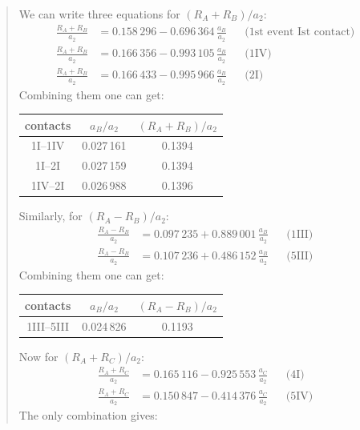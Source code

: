 \begin{description}
\begin{description}
\begin{quote}
    We can write three equations for $(R_A + R_B)/a_2$:
    \begin{align*}
      \frac{R_A + R_B}{a_2}
        &= 0.158\,296 - 0.696\,364\,\frac{a_B}{a_2}
        && \text{(1st event Ist contact)} \\
      \frac{R_A + R_B}{a_2}
        &= 0.166\,356 - 0.993\,105\,\frac{a_B}{a_2}
        && \text{(1IV)} \\
      \frac{R_A + R_B}{a_2}
        &= 0.166\,433 - 0.995\,966\,\frac{a_B}{a_2}
        && \text{(2I)}
    \end{align*}
    Combining them one can get:
    \begin{center}
    \begin{tabular}{ccc}
      \hline
      contacts & $a_B/a_2$ & $(R_A + R_B)/a_2$ \\
      \hline
      1I--1IV & 0.027\,161 & 0.1394 \\
      1I--2I  & 0.027\,159 & 0.1394 \\
      1IV--2I & 0.026\,988 & 0.1396 \\
      \hline
    \end{tabular}
    \end{center}
    Similarly, for $(R_A - R_B)/a_2$:
    \begin{align*}
      \frac{R_A - R_B}{a_2}
        &= 0.097\,235 + 0.889\,001\,\frac{a_B}{a_2}
        && \text{(1III)} \\
      \frac{R_A - R_B}{a_2}
        &= 0.107\,236 + 0.486\,152\,\frac{a_B}{a_2}
        && \text{(5III)}
    \end{align*}
    Combining them one can get:
    \begin{center}
    \begin{tabular}{ccc}
      \hline
      contacts & $a_B/a_2$ & $(R_A - R_B)/a_2$ \\
      \hline
      1III--5III & 0.024\,826 & 0.1193 \\
      \hline
    \end{tabular}
    \end{center}
    Now for $(R_A + R_C)/a_2$:
    \begin{align*}
      \frac{R_A + R_C}{a_2}
        &= 0.165\,116 - 0.925\,553\,\frac{a_C}{a_2}
        && \text{(4I)} \\
      \frac{R_A + R_C}{a_2}
        &= 0.150\,847 - 0.414\,376\,\frac{a_C}{a_2}
        && \text{(5IV)}
    \end{align*}
    The only combination gives:
    \begin{center}

\end{center}
\end{quote}
\end{description}
\end{description}
